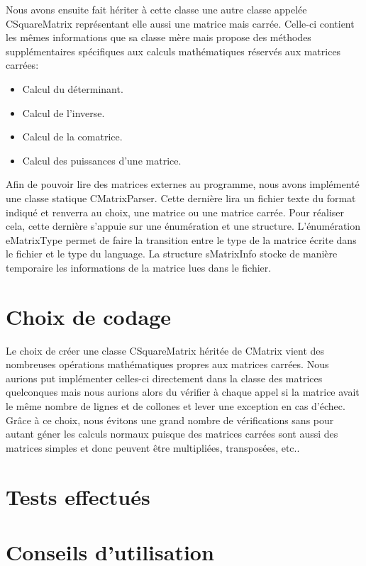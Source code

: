 		Nous avons ensuite fait hériter à cette classe une autre classe appelée CSquareMatrix représentant elle aussi une matrice mais carrée. Celle-ci contient les mêmes informations que sa classe mère mais propose des méthodes supplémentaires spécifiques aux calculs mathématiques réservés aux matrices carrées:
		\begin{itemize}
			\item Calcul du déterminant.
			\item Calcul de l'inverse.
			\item Calcul de la comatrice.
			\item Calcul des puissances d'une matrice.
		\end{itemize}
		
		Afin de pouvoir lire des matrices externes au programme, nous avons implémenté une classe statique CMatrixParser. Cette dernière lira un fichier texte du format indiqué et renverra au choix, une matrice ou une matrice carrée. Pour réaliser cela, cette dernière s'appuie sur une énumération et une structure. L'énumération eMatrixType permet de faire la transition entre le type de la matrice écrite dans le fichier et le type du language. La structure sMatrixInfo stocke de manière temporaire les informations de la matrice lues dans le fichier. 
		
	\chapter{Choix de codage}
		Le choix de créer une classe CSquareMatrix héritée de CMatrix vient des nombreuses opérations mathématiques propres aux matrices carrées. Nous aurions put implémenter celles-ci directement dans la classe des matrices quelconques mais nous aurions alors du vérifier à chaque appel si la matrice avait le même nombre de lignes et de collones et lever une exception en cas d'échec.
		Grâce à ce choix, nous évitons une grand nombre de vérifications sans pour autant géner les calculs normaux puisque des matrices carrées sont aussi des matrices simples et donc peuvent être multipliées, transposées, etc..
	
	
	\chapter{Tests effectués}
	
	
	\chapter{Conseils d'utilisation}


